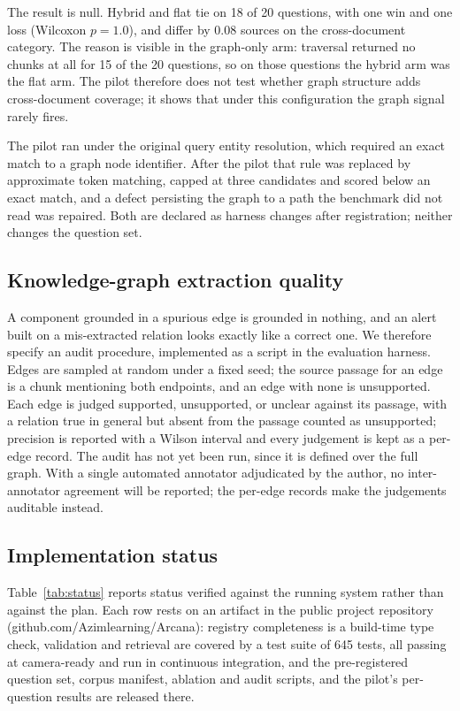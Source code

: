 \documentclass[conference]{IEEEtran}
\begin{document}
The result is null. Hybrid and flat tie on 18 of 20 questions, with one win and one loss (Wilcoxon $p = 1.0$), and differ by 0.08 sources on the cross-document category. The reason is visible in the graph-only arm: traversal returned no chunks at all for 15 of the 20 questions, so on those questions the hybrid arm was the flat arm. The pilot therefore does not test whether graph structure adds cross-document coverage; it shows that under this configuration the graph signal rarely fires.

The pilot ran under the original query entity resolution, which required an exact match to a graph node identifier. After the pilot that rule was replaced by approximate token matching, capped at three candidates and scored below an exact match, and a defect persisting the graph to a path the benchmark did not read was repaired. Both are declared as harness changes after registration; neither changes the question set.

\subsection{Knowledge-graph extraction quality}
\label{sec:extraction-quality}
A component grounded in a spurious edge is grounded in nothing, and an alert built on a mis-extracted relation looks exactly like a correct one. We therefore specify an audit procedure, implemented as a script in the evaluation harness. Edges are sampled at random under a fixed seed; the source passage for an edge is a chunk mentioning both endpoints, and an edge with none is unsupported. Each edge is judged supported, unsupported, or unclear against its passage, with a relation true in general but absent from the passage counted as unsupported; precision is reported with a Wilson interval and every judgement is kept as a per-edge record. The audit has not yet been run, since it is defined over the full graph. With a single automated annotator adjudicated by the author, no inter-annotator agreement will be reported; the per-edge records make the judgements auditable instead.

\subsection{Implementation status}
Table~\ref{tab:status} reports status verified against the running system rather than against the plan. Each row rests on an artifact in the public project repository (github.com/Azimlearning/Arcana): registry completeness is a build-time type check, validation and retrieval are covered by a test suite of 645 tests, all passing at camera-ready and run in continuous integration, and the pre-registered question set, corpus manifest, ablation and audit scripts, and the pilot's per-question results are released there.
\end{document}
